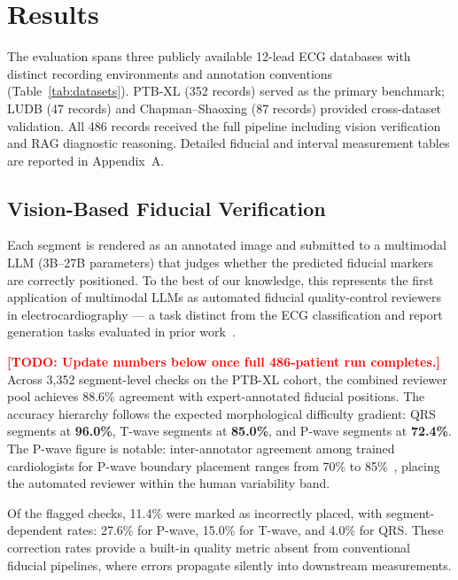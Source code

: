 \documentclass[journal,compsoc]{IEEEtran}
\newcommand{\todo}[1]{\textcolor{red}{\textbf{[TODO: #1]}}}
\begin{document}
\section{Results}
\label{sec:results}

The evaluation spans three publicly available 12-lead ECG databases with distinct recording environments and annotation conventions (Table~\ref{tab:datasets}). PTB-XL (352 records) served as the primary benchmark; LUDB (47 records) and Chapman--Shaoxing (87 records) provided cross-dataset validation. All 486 records received the full pipeline including vision verification and RAG diagnostic reasoning. Detailed fiducial and interval measurement tables are reported in Appendix~A.

\subsection{Vision-Based Fiducial Verification}
\label{sec:results_vision}

Each segment is rendered as an annotated image and submitted to a multimodal LLM (3B--27B parameters) that judges whether the predicted fiducial markers are correctly positioned. To the best of our knowledge, this represents the first application of multimodal LLMs as automated fiducial quality-control reviewers in electrocardiography --- a task distinct from the ECG classification and report generation tasks evaluated in prior work~\cite{li2026pulse,ecg_lm_2025,ecg_chat2024,meit2024}.

\todo{Update numbers below once full 486-patient run completes.}
Across 3,352 segment-level checks on the PTB-XL cohort, the combined reviewer pool achieves 88.6\% agreement with expert-annotated fiducial positions. The accuracy hierarchy follows the expected morphological difficulty gradient: QRS segments at \textbf{96.0\%}, T-wave segments at \textbf{85.0\%}, and P-wave segments at \textbf{72.4\%}. The P-wave figure is notable: inter-annotator agreement among trained cardiologists for P-wave boundary placement ranges from 70\% to 85\%~\cite{schlapfer2017computer}, placing the automated reviewer within the human variability band.

Of the flagged checks, 11.4\% were marked as incorrectly placed, with segment-dependent rates: 27.6\% for P-wave, 15.0\% for T-wave, and 4.0\% for QRS. These correction rates provide a built-in quality metric absent from conventional fiducial pipelines, where errors propagate silently into downstream measurements.
\end{document}
